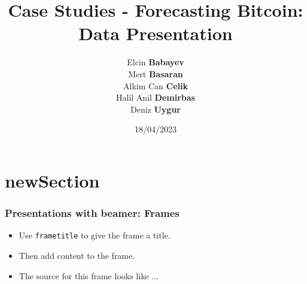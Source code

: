 \documentclass{beamer}
\title{Case Studies - Forecasting Bitcoin: \\Data Presentation}
\author{Elcin \textbf {Babayev}\\
Mert \textbf{Basaran}\\
Alkim Can \textbf{Celik}\\
Halil Anil \textbf{Demirbas}\\
Deniz \textbf{Uygur}}
\institute{Technische Universität Dortmund}
\date{18/04/2023}
\begin{document}
	\begin{frame}
		\titlepage %
	\end{frame}
	\section{newSection}
	\begin{frame}
		\frametitle{Presentations with beamer: Frames}
		\begin{itemize}
			\item Use \texttt{frametitle} to give the frame a title.
			\item Then add content to the frame.
			\item The source for this frame looks like ...
		\end{itemize}
	\end{frame}
\end{document}
